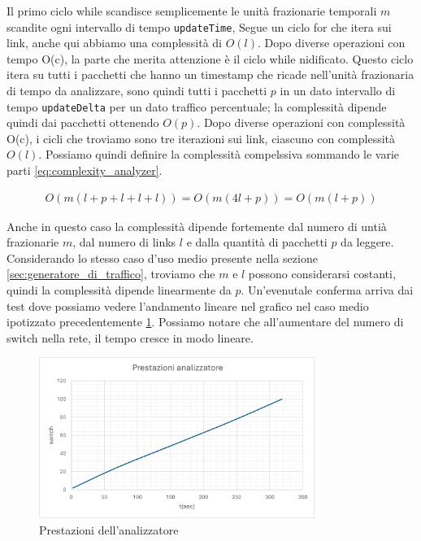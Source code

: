 \documentclass[binding=0.6cm]{sapthesis}
\begin{document}
Il primo ciclo while scandisce semplicemente le unità frazionarie temporali \(m\) scandite ogni intervallo di tempo \texttt{updateTime},
Segue un ciclo for che itera sui link, anche qui abbiamo una complessità di \(O(l)\). Dopo diverse operazioni con tempo O(c), la parte che merita attenzione è il ciclo while nidificato.
Questo ciclo itera su tutti i pacchetti che hanno un timestamp che ricade nell'unità frazionaria di tempo da analizzare, sono quindi tutti i pacchetti \(p\) in un dato intervallo di tempo \texttt{updateDelta} per un dato traffico percentuale;
la complessità dipende quindi dai pacchetti ottenendo \(O(p)\). Dopo diverse
operazioni con complessità O(c), i cicli che troviamo sono tre iterazioni sui link, ciascuno con complessità \(O(l)\).
Possiamo quindi definire la complessità compelssiva sommando le varie parti \ref{eq:complexity_analyzer}.


\begin{align}
    O(m(l+p+l+l+l)) = O(m(4l+p)) = O(m(l+p))
    \label{eq:complexity_analyzer}
\end{align}

Anche in questo caso la complessità dipende fortemente dal numero di untià frazionarie \(m\), dal numero di links \(l\) e dalla quantità di pacchetti
\(p\) da leggere. Considerando lo stesso caso d'uso medio presente nella sezione \ref{sec:generatore_di_traffico}, troviamo che \(m\) e \(l\) possono 
considerarsi costanti, quindi la complessità dipende linearmente da \(p\).
Un'evenutale conferma arriva dai test dove possiamo vedere l'andamento lineare nel grafico nel caso medio ipotizzato precedentemente \ref{fig:prestazioni_analizzatore}. Possiamo
notare che all'aumentare del numero di switch nella rete, il tempo cresce in modo lineare.

\begin{figure}[h]
    \centering
    \includegraphics[width=0.8\textwidth]{immagini/prestazioni_analyzer.png}
    \caption{Prestazioni dell'analizzatore}
    \label{fig:prestazioni_analizzatore}
\end{figure}
\end{document}
